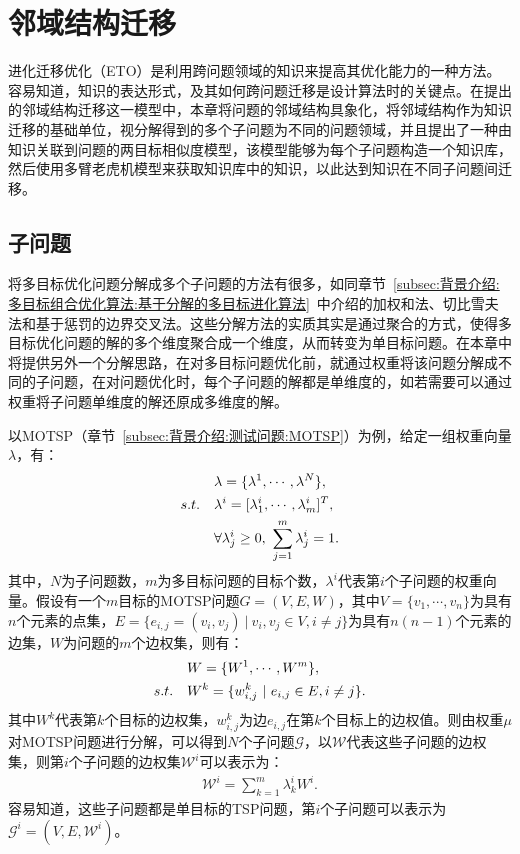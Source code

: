 \section{邻域结构迁移}
\label{sec:NST:邻域结构迁移}
进化迁移优化（ETO）是利用跨问题领域的知识来提高其优化能力的一种方法。容易知道，知识的表达形式，及其如何跨问题迁移是设计算法时的关键点。在提出的邻域结构迁移这一模型中，本章将问题的邻域结构具象化，将邻域结构作为知识迁移的基础单位，视分解得到的多个子问题为不同的问题领域，并且提出了一种由知识关联到问题的两目标相似度模型，该模型能够为每个子问题构造一个知识库，然后使用多臂老虎机模型来获取知识库中的知识，以此达到知识在不同子问题间迁移。

\subsection{子问题}
\label{subsec:NST:邻域结构迁移:子问题}
将多目标优化问题分解成多个子问题的方法有很多，如同章节~\ref{subsec:背景介绍:多目标组合优化算法:基于分解的多目标进化算法}~中介绍的加权和法、切比雪夫法和基于惩罚的边界交叉法。这些分解方法的实质其实是通过聚合的方式，使得多目标优化问题的解的多个维度聚合成一个维度，从而转变为单目标问题。在本章中将提供另外一个分解思路，在对多目标问题优化前，就通过权重将该问题分解成不同的子问题，在对问题优化时，每个子问题的解都是单维度的，如若需要可以通过权重将子问题单维度的解还原成多维度的解。
\par
以MOTSP（章节~\ref{subsec:背景介绍:测试问题:MOTSP}）为例，给定一组权重向量$\lambda$，有：
\begin{align}
    \label{eq:NST:权重向量}
    & \lambda = \{ \lambda^1, \cdots, \lambda^N \}, \\
    s.t. \quad & \lambda^{i} = [ \lambda^{i}_1, \cdots, \lambda^{i}_m ]^T, \notag \\
    & \forall \lambda^{i}_j \geq 0, \ \sum_{j=1}^m \lambda^{i}_j = 1. \notag
\end{align}
其中，$N$为子问题数，$m$为多目标问题的目标个数，$\lambda^{i}$代表第$i$个子问题的权重向量。假设有一个$m$目标的MOTSP问题$G = (V, E, W)$，其中$V = \{v_1, \cdots, v_n\}$为具有$n$个元素的点集，$E = \{ e_{i,j} = (v_i, v_j) \ | \ v_i, v_j \in V, i \not = j \}$为具有$n(n-1)$个元素的边集，$W$为问题的$m$个边权集，则有：
\begin{align}
    \label{eq:NST:边权矩阵}
    & W = \{ W^1, \cdots, W^m \}, \\
    s.t. \quad & W^k = \{ w^k_{i,j} \ | \ e_{i,j} \in E, i \not = j \}. \notag
\end{align}
其中$W^k$代表第$k$个目标的边权集，$w^k_{i,j}$为边$e_{i,j}$在第$k$个目标上的边权值。则由权重$\mu$对MOTSP问题进行分解，可以得到$N$个子问题$\mathcal{G}$，以$\mathcal{W}$代表这些子问题的边权集，则第$i$个子问题的边权集$\mathcal{W}^i$可以表示为：
\begin{align}
    \label{eq:NST:SP}
    \mathcal{W}^i = \sum_{k=1}^m  \lambda^{i}_k W^i.
\end{align}
容易知道，这些子问题都是单目标的TSP问题，第$i$个子问题可以表示为$\mathcal{G}^i = (V, E, \mathcal{W}^i)$。

